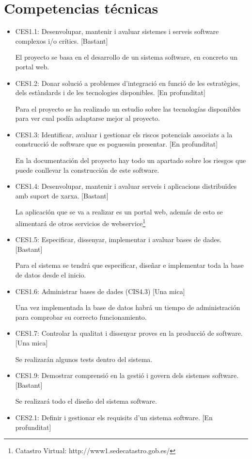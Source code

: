 \section{Competencias técnicas}
\begin{itemize}
\item CES1.1: Desenvolupar, mantenir i avaluar sistemes i serveis software complexos i/o crítics. [Bastant]

El proyecto se basa en el desarrollo de un sistema software, en concreto un portal web.
\item CES1.2: Donar solució a problemes d'integració en funció de les estratègies, dels estàndards i de les tecnologies disponibles. [En profunditat]

Para el proyecto se ha realizado un estudio sobre las tecnologías disponibles para ver cual podía adaptarse mejor al proyecto.
\item CES1.3: Identificar, avaluar i gestionar els riscos potencials associats a la construcció de software que es poguessin presentar. [En profunditat]

En la documentación del proyecto hay todo un apartado sobre los riesgos que puede conllevar la construcción de este software.
\item CES1.4: Desenvolupar, mantenir i avaluar serveis i aplicacions distribuïdes amb suport de xarxa. [Bastant]

La aplicación que se va a realizar es un portal web, además de esto se alimentará de otros servicios de webservice\footnote{Catastro Virtual: http://www1.sedecatastro.gob.es/}
\item CES1.5: Especificar, dissenyar, implementar i avaluar bases de dades. [Bastant]

Para el sistema se tendrá que especificar, diseñar e implementar toda la base de datos desde el inicio.
\item CES1.6: Administrar bases de dades (CIS4.3) [Una mica]

Una vez implementada la base de datos habrá un tiempo de administración para comprobar su correcto funcionamiento.
\item CES1.7: Controlar la qualitat i dissenyar proves en la producció de software. [Una mica]

Se realizarán algunos tests dentro del sistema.
\item CES1.9: Demostrar comprensió en la gestió i govern dels sistemes software. [Bastant]

Se realizará todo el diseño del sistema software.
\item CES2.1: Definir i gestionar els requisits d'un sistema software. [En profunditat]


\end{itemize}
